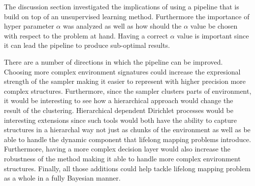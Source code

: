 \documentclass[twoside,hidelinks]{article}
\begin{document}
 The discussion section investigated the implications of using a pipeline that is build on top of an unsupervised learning method. Furthermore the importance of hyper parameter $\alpha$ was analyzed as well as how should the $\alpha$ value be chosen with respect to the problem at hand. Having a correct $\alpha$ value is important since it can lead the pipeline to produce sub-optimal results.
 
 There are a number of directions in which the pipeline can be improved. Choosing more complex environment signatures could increase the expresional strength of the sampler making it easier to represent with higher precision more complex structures. Furthermore, since the sampler clusters parts of environment, it would be interesting to see how a hierarchical approach would change the result of the clustering. Hierarchical dependent Dirichlet processes would be interesting extensions since such tools would both have the ability to capture structures in a hierarchal way not just as chunks of the environment as well as be able to handle the dynamic component that lifelong mapping problems introduce. Furthermore, having a more complex decision layer would also increase the robustness of the method making it able to handle more complex environment structures. 
Finally, all those additions could help tackle lifelong mapping problem as a whole in a fully Bayesian manner.


\end{document}
